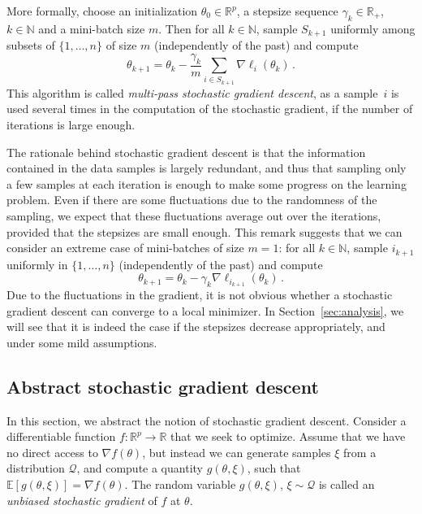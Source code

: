 \documentclass[11pt,reqno]{article}
\newcommand{\N}{\mathbb{N}}
\newcommand{\E}{\mathbb{E}}
\newcommand{\R}{\mathbb{R}}
\newcommand{\cQ}{\mathcal{Q}}
\numberwithin{equation}{section}
\theoremstyle{plain}
\theoremstyle{definition}
\theoremstyle{remark}
\begin{document}
More formally, choose an initialization $\theta_0 \in \R^p$, a stepsize sequence $\gamma_k \in \R_+$, $k \in \N$ and a mini-batch size $m$. Then for all $k \in \N$, sample $S_{k+1}$ uniformly among subsets of $\{1, \dots, n\}$ of size $m$ (independently of the past) and compute 
\begin{equation}
\label{eq:sgd-empirical-mini-batch}
	\theta_{k+1} = \theta_k - \frac{\gamma_k}{m} \sum_{i \in S_{k+1}} \nabla \ell_i(\theta_k) \, .
\end{equation}
This algorithm is called \emph{multi-pass stochastic gradient descent}, as a sample~$i$ is used several times in the computation of the stochastic gradient, if the number of iterations is large enough. 

The rationale behind stochastic gradient descent is that the information contained in the data samples is largely redundant, and thus that sampling only a few samples at each iteration is enough to make some progress on the learning problem. Even if there are some fluctuations due to the randomness of the sampling, we expect that these fluctuations average out over the iterations, provided that the stepsizes are small enough. This remark suggests that we can consider an extreme case of mini-batches of size $m=1$: for all $k \in \N$, sample $i_{k+1}$ uniformly in $\{1, \dots, n\}$ (independently of the past) and compute
\begin{equation}
	\label{eq:sgd-empirical}
	\theta_{k+1} = \theta_k - \gamma_k \nabla \ell_{i_{k+1}}(\theta_k) \, .
\end{equation}
Due to the fluctuations in the gradient, it is not obvious whether a stochastic gradient descent can converge to a local minimizer. In Section~\ref{sec:analysis}, we will see that it is indeed the case if the stepsizes decrease appropriately, and under some mild assumptions.



\subsection{Abstract stochastic gradient descent}
\label{sec:sgd-abstract}

In this section, we abstract the notion of stochastic gradient descent. Consider a differentiable function $f:\R^p \to \R$ that we seek to optimize. Assume that we have no direct access to $\nabla f(\theta)$, but instead we can generate samples $\xi$ from a distribution $\cQ$, and compute a quantity $g(\theta, \xi)$, such that $\E[g(\theta, \xi)] = \nabla f(\theta)$. The random variable $g(\theta, \xi)$, $\xi \sim \cQ$ is called an \emph{unbiased stochastic gradient} of $f$ at $\theta$.
\end{document}
